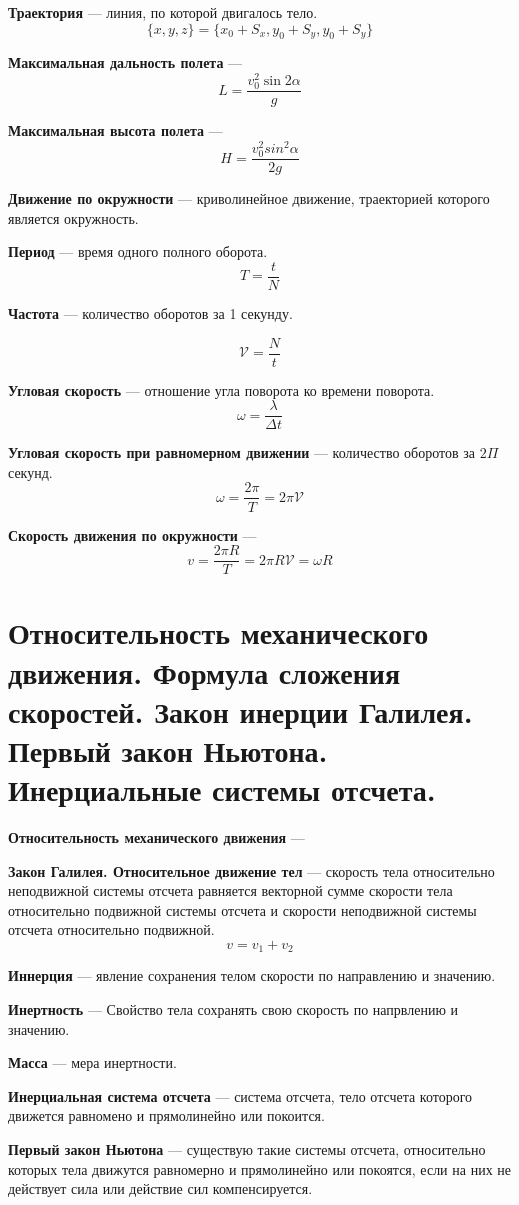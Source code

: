\documentclass{report}
\begin{document}
{}

{\bf Траектория} ---
линия, по которой двигалось тело.
$$
\{x,y,z\}=\{x_0+S_x, y_0+S_y, y_0+S_y\}
$$

{\bf Максимальная дальность полета} ---
$$
L=\frac{v^2_0\sin{2\alpha}}{g}
$$

{\bf Максимальная высота полета} ---
$$
H=\frac{v^2_0sin^2{\alpha}}{2g}
$$

{\bf Движение по окружности} ---
криволинейное движение, траекторией которого является окружность.

{\bf Период} ---
время одного полного оборота.
$$
T=\frac{t}{N}
$$

{\bf Частота} ---
количество оборотов за 1 секунду.

$$
\mathcal{V} = \frac{N}{t}
$$

{\bf Угловая скорость} ---
отношение угла поворота ко времени поворота.
$$
\omega =\frac{\lambda}{\Delta t}
$$

{\bf Угловая скорость при равномерном движении} ---
количество оборотов за $2\Pi$ секунд.
$$
\omega =\frac{2\pi}{T}=2\pi \mathcal{V}
$$

{\bf Скорость движения по окружности} ---
$$
v=\frac{2\pi R}{T}=2\pi R \mathcal{V} = \omega R
$$



\part{Относительность механического движения. 
Формула сложения скоростей. 
Закон инерции Галилея. 
Первый закон Ньютона. 
Инерциальные системы отсчета. }

{\bf Относительность механического движения} ---

{\bf Закон Галилея. Относительное движение тел} ---
скорость тела относительно неподвижной системы отсчета равняется векторной 
сумме скорости тела относительно подвижной системы отсчета и скорости 
неподвижной системы отсчета относительно подвижной.
$$
v=v_1+v_2
$$

{\bf Иннерция} ---
явление сохранения телом скорости по направлению и значению.

{\bf Инертность} ---
Свойство тела сохранять свою скорость по напрвлению и значению.

{\bf Масса} ---
мера инертности.

{\bf Инерциальная система отсчета} ---
система отсчета, тело отсчета которого движется равномено и прямолинейно или покоится.

{\bf Первый закон Ньютона} ---
существую такие системы отсчета, относительно которых тела движутся равномерно и прямолинейно или 
покоятся, если на них не действует сила или действие сил компенсируется.
\end{document}
